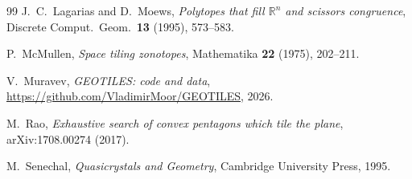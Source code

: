 \documentclass[11pt]{amsart}
\theoremstyle{definition}
\newcommand{\R}{\mathbb{R}}
\begin{document}
\begin{thebibliography}{99}
 J.~C.~Lagarias and D.~Moews, \emph{Polytopes that fill $\R^n$ and scissors congruence}, Discrete
Comput.\ Geom.\ \textbf{13} (1995), 573--583.

 P.~McMullen, \emph{Space tiling zonotopes}, Mathematika \textbf{22} (1975), 202--211.

 V.~Muravev, \emph{GEOTILES: code and data}, \url{https://github.com/VladimirMoor/GEOTILES}, 2026.

 M.~Rao, \emph{Exhaustive search of convex pentagons which tile the plane}, arXiv:1708.00274
(2017).

 M.~Senechal, \emph{Quasicrystals and Geometry}, Cambridge University Press, 1995.

\end{thebibliography}
\end{document}
